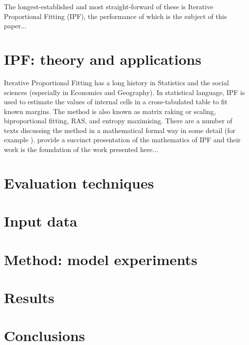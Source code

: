 \documentclass[a4paper,10pt]{article}
\begin{document}
The longest-established and most straight-forward of these is Iterative Proportional Fitting (IPF), the performance of which is the subject of this paper...





\section{IPF: theory and applications}
Iterative Proportional Fitting has a long history in Statistics and the social
sciences (especially in Economics and Geography).
In statistical language, IPF is used to estimate the values of internal
cells in a cross-tabulated table to fit known margins.
The method is also known as matrix raking or scaling,
biproportional fitting, RAS, and entropy maximising.
There are a number of texts discussing the method in a mathematical formal
way in some detail (for example \citealp{Mosteller1968, Fienberg1970, Pritchard2012}).
\citep{Birkin1988} provide a succinct presentation of the
mathematics of IPF and their work is the foundation of
the work presented here...%

\section{Evaluation techniques}
\section{Input data}
\section{Method: model experiments}
\section{Results}
\section{Conclusions}


\end{document}
